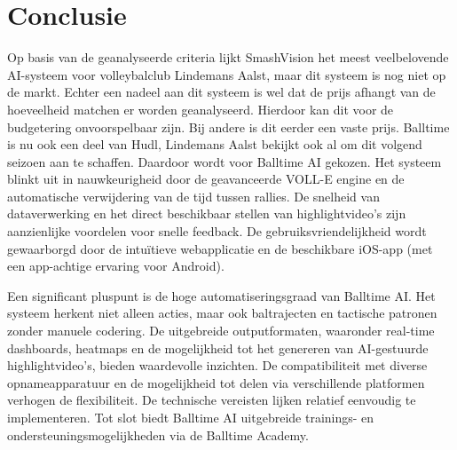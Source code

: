 \section{Conclusie}
Op basis van de geanalyseerde criteria lijkt SmashVision het meest veelbelovende AI-systeem voor volleybalclub Lindemans Aalst, maar dit systeem is nog niet op de markt. Echter een nadeel aan dit systeem is wel dat de prijs afhangt van de hoeveelheid matchen er worden geanalyseerd. Hierdoor kan dit voor de budgetering onvoorspelbaar zijn. Bij andere is dit eerder een vaste prijs. Balltime is nu ook een deel van Hudl, Lindemans Aalst bekijkt ook al om dit volgend seizoen aan te schaffen. Daardoor wordt voor Balltime AI gekozen. Het systeem blinkt uit in nauwkeurigheid door de geavanceerde VOLL-E engine en de automatische verwijdering van de tijd tussen rallies. De snelheid van dataverwerking en het direct beschikbaar stellen van highlightvideo's zijn aanzienlijke voordelen voor snelle feedback. De gebruiksvriendelijkheid wordt gewaarborgd door de intuïtieve webapplicatie en de beschikbare iOS-app (met een app-achtige ervaring voor Android).

Een significant pluspunt is de hoge automatiseringsgraad van Balltime AI. Het systeem herkent niet alleen acties, maar ook baltrajecten en tactische patronen zonder manuele codering. De uitgebreide outputformaten, waaronder real-time dashboards, heatmaps en de mogelijkheid tot het genereren van AI-gestuurde highlightvideo's, bieden waardevolle inzichten. De compatibiliteit met diverse opnameapparatuur en de mogelijkheid tot delen via verschillende platformen verhogen de flexibiliteit. De technische vereisten lijken relatief eenvoudig te implementeren. Tot slot biedt Balltime AI uitgebreide trainings- en ondersteuningsmogelijkheden via de Balltime Academy.
